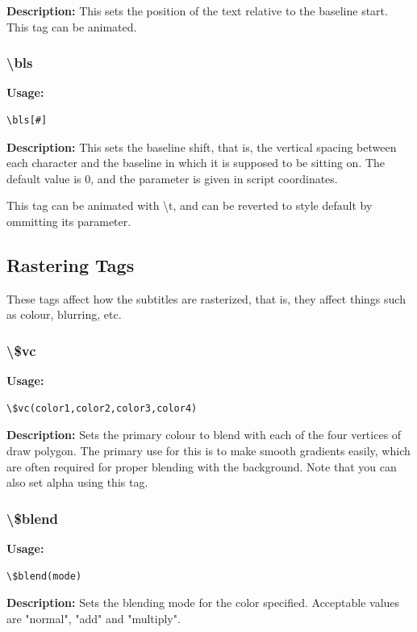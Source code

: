 \documentclass{spec}
\begin{document}
\textbf{Description:}
This sets the position of the text relative to the baseline start. This tag can be animated.


\subsubsection{\textbackslash bls}
\textbf{Usage:}
\begin{verbatim}
\bls[#]
\end{verbatim}

\textbf{Description:}
This sets the baseline shift, that is, the vertical spacing between each character and the baseline
in which it is supposed to be sitting on. The default value is 0, and the parameter is given in
script coordinates.

This tag can be animated with \textbackslash t, and can be reverted to style default by ommitting
its parameter.

\subsection{Rastering Tags}
These tags affect how the subtitles are rasterized, that is, they affect things such as
colour, blurring, etc.

\subsubsection{\textbackslash\$vc}
\textbf{Usage:}
\begin{verbatim}
\$vc(color1,color2,color3,color4)
\end{verbatim}

\textbf{Description:}
Sets the primary colour to blend with each of the four vertices of draw polygon. The primary use for this is to make smooth gradients easily, which are often required for proper blending with the background. Note that you can also set alpha using this tag.

\subsubsection{\textbackslash{\$blend}}
\textbf{Usage:}
\begin{verbatim}
\$blend(mode)
\end{verbatim}

\textbf{Description:}
Sets the blending mode for the color specified. Acceptable values are "normal", "add" and "multiply".
\end{document}
